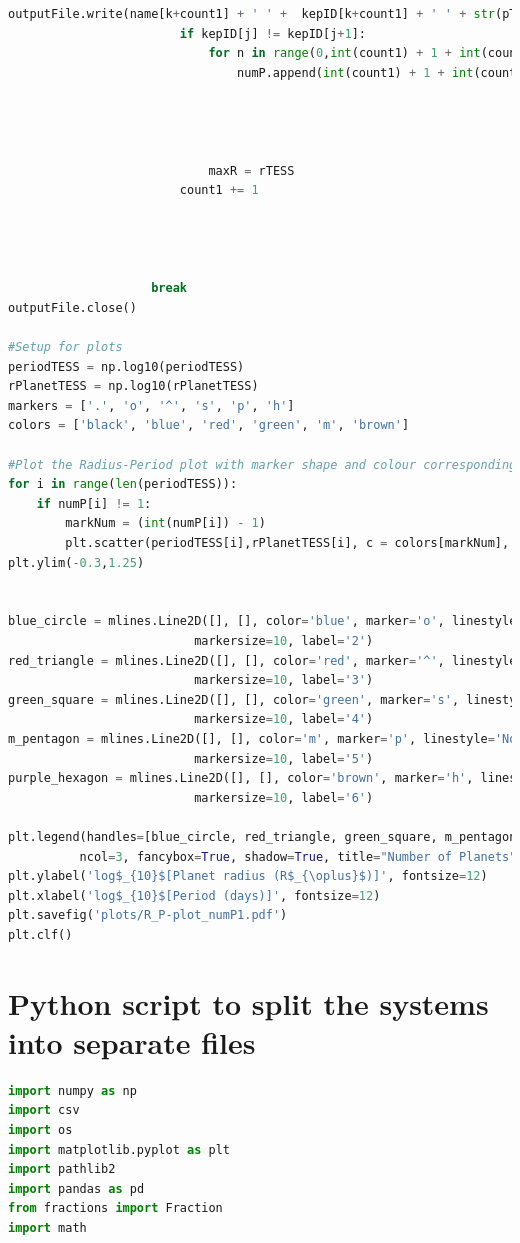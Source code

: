\documentclass[12pt]{report}
\begin{document}
\begin{appendix}
\begin{lstlisting}[language=Python]
						outputFile.write(name[k+count1] + ' ' +  kepID[k+count1] + ' ' + str(pTESS) + ' ' + str(rTESS) + ' ' + mStar[k+count1] + ' ' + numEpoch[k+count1] + ' '  + transitDur[k+count1] + ' ' + rStar[k+count1] + ' ' + str(RA[i+count1]) + ' ' + str(dec[i+count1]) + ' ' + effTempKep[k+count1] + ' ' + str(effTempSul[i+count1]) + ' ' + str(ICMag[i+count1]) + '\n')
						if kepID[j] != kepID[j+1]:
							for n in range(0,int(count1) + 1 + int(countP)):
								numP.append(int(count1) + 1 + int(countP))

								
								

							maxR = rTESS
						count1 += 1

						
						
		
					break
outputFile.close()

#Setup for plots					
periodTESS = np.log10(periodTESS)
rPlanetTESS = np.log10(rPlanetTESS)	
markers = ['.', 'o', '^', 's', 'p', 'h']
colors = ['black', 'blue', 'red', 'green', 'm', 'brown']

#Plot the Radius-Period plot with marker shape and colour corresponding to the multiplicity of the system.
for i in range(len(periodTESS)):
	if numP[i] != 1:
		markNum = (int(numP[i]) - 1)
		plt.scatter(periodTESS[i],rPlanetTESS[i], c = colors[markNum], marker=markers[markNum], edgecolor='black', label=numP, alpha=0.6)
plt.ylim(-0.3,1.25)


blue_circle = mlines.Line2D([], [], color='blue', marker='o', linestyle='None',
                          markersize=10, label='2')
red_triangle = mlines.Line2D([], [], color='red', marker='^', linestyle='None',
                          markersize=10, label='3')
green_square = mlines.Line2D([], [], color='green', marker='s', linestyle='None',
                          markersize=10, label='4')
m_pentagon = mlines.Line2D([], [], color='m', marker='p', linestyle='None',
                          markersize=10, label='5')
purple_hexagon = mlines.Line2D([], [], color='brown', marker='h', linestyle='None',
                          markersize=10, label='6')
                          
plt.legend(handles=[blue_circle, red_triangle, green_square, m_pentagon, purple_hexagon] ,loc='upper center', bbox_to_anchor=(0.5, 1.15),
          ncol=3, fancybox=True, shadow=True, title="Number of Planets")
plt.ylabel('log$_{10}$[Planet radius (R$_{\oplus}$)]', fontsize=12)
plt.xlabel('log$_{10}$[Period (days)]', fontsize=12)
plt.savefig('plots/R_P-plot_numP1.pdf')
plt.clf()
\end{lstlisting}
\chapter{Python script to split the systems into separate files}
\begin{lstlisting}[language=Python]
import numpy as np
import csv
import os
import matplotlib.pyplot as plt
import pathlib2
import pandas as pd
from fractions import Fraction  
import math


\end{lstlisting}
\end{appendix}
\end{document}
